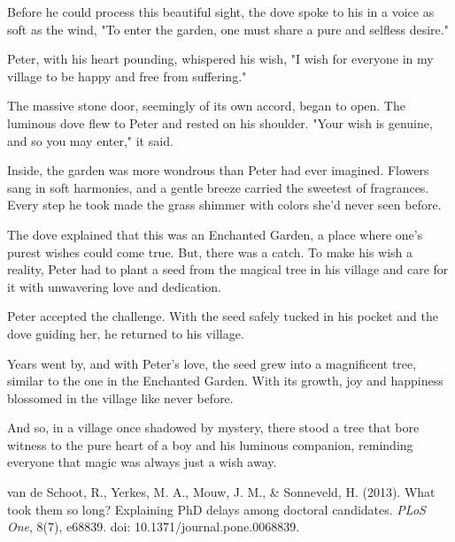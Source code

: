 \documentclass[10pt, a4paper, titlepage]{article}
\begin{document}
Before he could process this beautiful sight, the dove spoke to his in a voice as soft as the wind, "To enter the garden, one must share a pure and selfless desire."

Peter, with his heart pounding, whispered his wish, "I wish for everyone in my village to be happy and free from suffering."

The massive stone door, seemingly of its own accord, began to open. The luminous dove flew to Peter and rested on his shoulder. "Your wish is genuine, and so you may enter," it said.

Inside, the garden was more wondrous than Peter had ever imagined. Flowers sang in soft harmonies, and a gentle breeze carried the sweetest of fragrances. Every step he took made the grass shimmer with colors she'd never seen before.

The dove explained that this was an Enchanted Garden, a place where one’s purest wishes could come true. But, there was a catch. To make his wish a reality, Peter had to plant a seed from the magical tree in his village and care for it with unwavering love and dedication.

Peter accepted the challenge. With the seed safely tucked in his pocket and the dove guiding her, he returned to his village.

Years went by, and with Peter's love, the seed grew into a magnificent tree, similar to the one in the Enchanted Garden. With its growth, joy and happiness blossomed in the village like never before.

And so, in a village once shadowed by mystery, there stood a tree that bore witness to the pure heart of a boy and his luminous companion, reminding everyone that magic was always just a wish away.


\begin{thebibliography}{9}

van de Schoot, R., Yerkes, M. A., Mouw, J. M., \& Sonneveld, H. (2013).
What took them so long? Explaining PhD delays among doctoral candidates.
\textit{PLoS One}, 8(7), e68839. 
doi: 10.1371/journal.pone.0068839.

\end{thebibliography}
\end{document}
